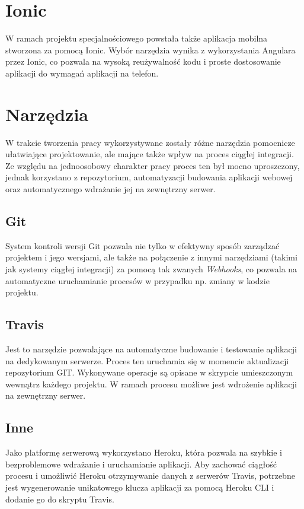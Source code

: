 \documentclass[eng,printmode]{mgr}
\begin{document}
\section{Ionic}
W ramach projektu specjalnościowego powstała także aplikacja mobilna stworzona za pomocą Ionic. Wybór narzędzia wynika z wykorzystania Angulara przez Ionic, co pozwala na wysoką reużywalność kodu i proste dostosowanie aplikacji do wymagań aplikacji na telefon.
\section{Narzędzia}
W trakcie tworzenia pracy wykorzystywane zostały różne narzędzia pomocnicze ułatwiające projektowanie, ale mające także wpływ na proces ciągłej integracji\cite{CI}. Ze względu na jednoosobowy charakter pracy proces ten był mocno uproszczony, jednak korzystano z repozytorium, automatyzacji budowania aplikacji webowej oraz automatycznego wdrażanie jej na zewnętrzny serwer.
\subsection{Git}
System kontroli wersji Git\cite{git} pozwala nie tylko w efektywny sposób zarządzać projektem i jego wersjami, ale także na połączenie z innymi narzędziami (takimi jak systemy ciągłej integracji) za pomocą tak zwanych \textit{Webhooks}\cite{webhooks}, co pozwala na automatyczne uruchamianie procesów w przypadku np. zmiany w kodzie projektu.
\subsection{Travis}
Jest to narzędzie pozwalające na automatyczne budowanie i testowanie aplikacji na dedykowanym serwerze\cite{travis}. Proces ten uruchamia się w momencie aktualizacji repozytorium GIT. Wykonywane operacje są opisane w skrypcie umieszczonym wewnątrz każdego projektu. W ramach procesu możliwe jest wdrożenie aplikacji na zewnętrzny serwer.
\subsection{Inne}
Jako platformę serwerową wykorzystano Heroku\cite{heroku}, która pozwala na szybkie i bezproblemowe wdrażanie i uruchamianie aplikacji. Aby zachować ciągłość procesu i umożliwić Heroku otrzymywanie danych z serwerów Travis, potrzebne jest wygenerowanie unikatowego klucza aplikacji za pomocą Heroku CLI\cite{heroku_cli} i dodanie go do skryptu Travis.
\end{document}
